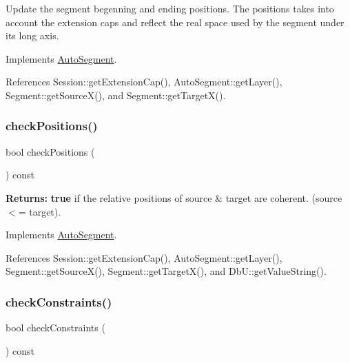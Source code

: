 Update the segment begenning and ending positions. The positions takes into account the extension caps and reflect the real space used by the segment under it\textquotesingle{}s long axis. 

Implements \mbox{\hyperlink{classKatabatic_1_1AutoSegment_a6d95f4de39c13611786c95ddc7b8942e}{Auto\+Segment}}.



References Session\+::get\+Extension\+Cap(), Auto\+Segment\+::get\+Layer(), Segment\+::get\+Source\+X(), and Segment\+::get\+Target\+X().

\mbox{\label{classKatabatic_1_1AutoHorizontal_a6575c17bfa589c087215c87678e5719c}} 
\subsubsection{\texorpdfstring{check\+Positions()}{checkPositions()}}
{\footnotesize\ttfamily bool check\+Positions (\begin{DoxyParamCaption}{ }\end{DoxyParamCaption}) const\hspace{0.3cm}{\ttfamily [virtual]}}

{\bfseries Returns\+:} {\bfseries true} if the relative positions of source \& target are coherent. (source $<$= target). 

Implements \mbox{\hyperlink{classKatabatic_1_1AutoSegment_af026a81002bd907f1ccd4a4784aaa1db}{Auto\+Segment}}.



References Session\+::get\+Extension\+Cap(), Auto\+Segment\+::get\+Layer(), Segment\+::get\+Source\+X(), Segment\+::get\+Target\+X(), and Db\+U\+::get\+Value\+String().

\mbox{\label{classKatabatic_1_1AutoHorizontal_a8aef8f4bbafe3426840f9ebf31bb3b81}} 
\subsubsection{\texorpdfstring{check\+Constraints()}{checkConstraints()}}
{\footnotesize\ttfamily bool check\+Constraints (\begin{DoxyParamCaption}{ }\end{DoxyParamCaption}) const\hspace{0.3cm}{\ttfamily [virtual]}}

